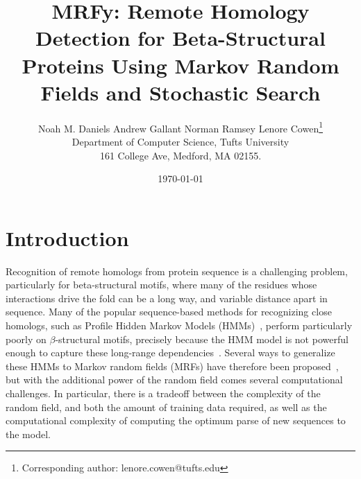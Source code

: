 \documentclass{acm_proc_article-sp}
\begin{document}
\title{MRFy: Remote Homology Detection for Beta-Structural Proteins
  Using Markov Random Fields and Stochastic Search}

\author{Noah M. Daniels \hspace*{8pt} Andrew Gallant \hspace*{8pt} Norman 
Ramsey \hspace*{8pt} 
Lenore Cowen\thanks{Corresponding author: lenore.cowen@tufts.edu}
\\ Department of Computer Science, Tufts University \\ 161 College Ave, 
Medford, MA 02155.}

\date{\today}

\maketitle




\begin{abstract}


\end{abstract} 




\section{Introduction}

Recognition of remote homologs from protein sequence is a challenging
problem, particularly for beta-structural motifs, where many of the
residues whose interactions drive the fold can be a long way, and
variable distance apart in sequence. 
Many of the popular
sequence-based methods for recognizing close homologs, such as Profile
Hidden Markov Models (HMMs)~\cite{blah,blah}, perform particularly poorly on
$\beta$-structural motifs, precisely because the HMM model is not
powerful enough to capture these long-range dependencies~\cite{blah}. 
Several ways
to generalize these HMMs to Markov random fields (MRFs) have therefore
been proposed~\cite{blah,blah,blah}, but with the additional power of the 
random field comes several computational challenges. 
In particular, there is a tradeoff
between the complexity of the random field, and both the amount of
training data required, as well as the computational complexity of
computing the optimum parse of new sequences to the model.
\end{document}
